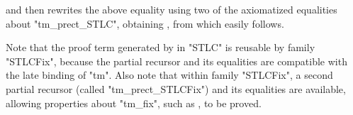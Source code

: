 \noindent
and then rewrites the above equality using two of the axiomatized
equalities about "tm_prect_STLC",
obtaining ,
from which  easily follows.

Note that the proof term generated by  in "STLC"
is reusable by family "STLCFix", because the partial recursor and its
equalities are compatible with the late binding of "tm".
Also note that within family "STLCFix", a second partial recursor
(called "tm_prect_STLCFix") and its equalities are available,
allowing properties about "tm_fix",
such as , to be proved.



\ifShowOldWriting

\newpage

